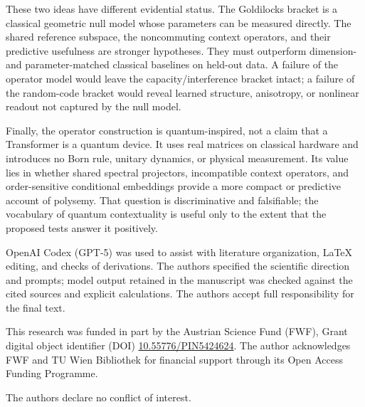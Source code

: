 \documentclass[
  aps,
  reprint,
  superscriptaddress,
  floatfix,
  nofootinbib,
  longbibliography
]{revtex4-2}
\begin{document}
These two ideas have different evidential status.  The Goldilocks bracket is
a classical geometric null model whose parameters can be measured directly.
The shared reference subspace, the noncommuting context operators, and their
predictive usefulness are stronger hypotheses.  They must outperform
dimension- and parameter-matched classical baselines on held-out data.  A
failure of the operator model would leave the capacity/interference bracket
intact; a failure of the random-code bracket would reveal learned structure,
anisotropy, or nonlinear readout not captured by the null model.

Finally, the operator construction is quantum-inspired, not a claim that a
Transformer is a quantum device.  It uses real matrices on classical hardware
and introduces no Born rule, unitary dynamics, or physical measurement.
Its value lies in whether shared spectral projectors, incompatible context
operators, and order-sensitive conditional embeddings provide a more compact
or predictive account of polysemy.  That question is discriminative and
falsifiable; the vocabulary of quantum contextuality is useful only to the
extent that the proposed tests answer it positively.

\begin{acknowledgments}
OpenAI Codex (GPT-5) was used to assist with literature organization, \LaTeX{}
editing, and checks of derivations.  The authors specified the scientific
direction and prompts; model output retained in the manuscript was checked
against the cited sources and explicit calculations.  The authors accept full
responsibility for the final text.

This research was funded in part by the Austrian
Science Fund (FWF), Grant digital object identifier (DOI)
\href{https://doi.org/10.55776/PIN5424624}{10.55776/PIN5424624}.
The author acknowledges FWF and TU Wien Bibliothek for financial support through its
Open Access Funding Programme.

The authors declare no conflict of interest.
\end{acknowledgments}


\end{document}
